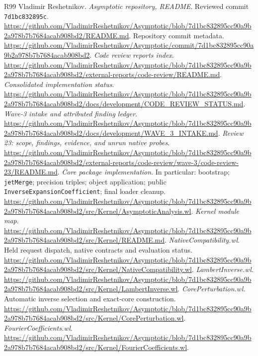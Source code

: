 \documentclass[11pt,letterpaper]{article}
\newcommand{\code}[1]{\texttt{#1}}
\begin{document}
\newpage
\begin{thebibliography}{R99}
\small
{} Vladimir Reshetnikov. \emph{Asymptotic repository, README}. Reviewed commit \code{7d1bc832895c}. \url{https://github.com/VladimirReshetnikov/Asymptotic/blob/7d1bc832895cc90a9b2a978b7b7684acab908bd2/README.md}.
 Repository commit metadata. \url{https://github.com/VladimirReshetnikov/Asymptotic/commit/7d1bc832895cc90a9b2a978b7b7684acab908bd2}.
 \emph{Code review reports index}. \url{https://github.com/VladimirReshetnikov/Asymptotic/blob/7d1bc832895cc90a9b2a978b7b7684acab908bd2/external-reports/code-review/README.md}.
 \emph{Consolidated implementation status}. \url{https://github.com/VladimirReshetnikov/Asymptotic/blob/7d1bc832895cc90a9b2a978b7b7684acab908bd2/docs/development/CODE_REVIEW_STATUS.md}.
 \emph{Wave-3 intake and attributed finding ledger}. \url{https://github.com/VladimirReshetnikov/Asymptotic/blob/7d1bc832895cc90a9b2a978b7b7684acab908bd2/docs/development/WAVE_3_INTAKE.md}.
 \emph{Review 23: scope, findings, evidence, and unrun native probes}. \url{https://github.com/VladimirReshetnikov/Asymptotic/blob/7d1bc832895cc90a9b2a978b7b7684acab908bd2/external-reports/code-review/wave-3/code-review-23/README.md}.
 \emph{Core package implementation}. In particular: bootstrap; \code{jetMerge}; precision triples; object application; public \code{InverseExpansionCoefficient}; final loader cleanup. \url{https://github.com/VladimirReshetnikov/Asymptotic/blob/7d1bc832895cc90a9b2a978b7b7684acab908bd2/src/Kernel/AsymptoticAnalysis.wl}.
 \emph{Kernel module map}. \url{https://github.com/VladimirReshetnikov/Asymptotic/blob/7d1bc832895cc90a9b2a978b7b7684acab908bd2/src/Kernel/README.md}.
 \emph{NativeCompatibility.wl}. Held request dispatch, native contracts and evaluation status. \url{https://github.com/VladimirReshetnikov/Asymptotic/blob/7d1bc832895cc90a9b2a978b7b7684acab908bd2/src/Kernel/NativeCompatibility.wl}.
 \emph{LambertInverse.wl}. \url{https://github.com/VladimirReshetnikov/Asymptotic/blob/7d1bc832895cc90a9b2a978b7b7684acab908bd2/src/Kernel/LambertInverse.wl}.
 \emph{CorePerturbation.wl}. Automatic inverse selection and exact-core construction. \url{https://github.com/VladimirReshetnikov/Asymptotic/blob/7d1bc832895cc90a9b2a978b7b7684acab908bd2/src/Kernel/CorePerturbation.wl}.
 \emph{FourierCoefficients.wl}. \url{https://github.com/VladimirReshetnikov/Asymptotic/blob/7d1bc832895cc90a9b2a978b7b7684acab908bd2/src/Kernel/FourierCoefficients.wl}.

\end{thebibliography}
\end{document}
